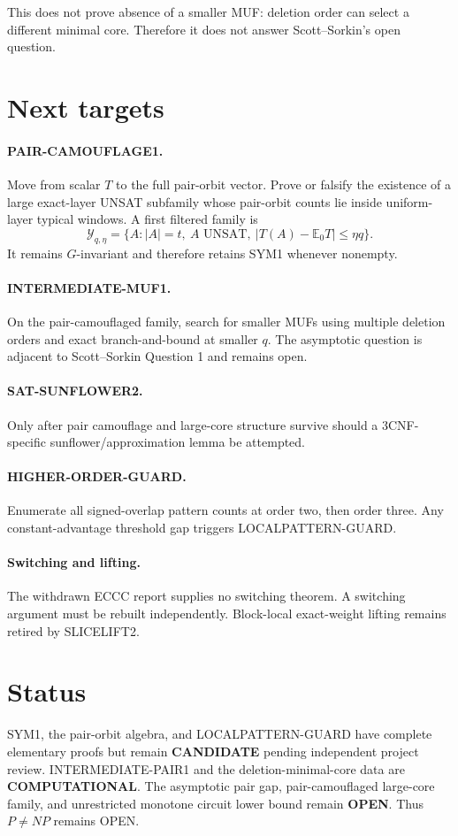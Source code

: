 \documentclass[11pt]{article}
\begin{document}
This does not prove absence of a smaller MUF: deletion order can select a
different minimal core. Therefore it does not answer Scott--Sorkin's open
question.

\section{Next targets}
\paragraph{PAIR-CAMOUFLAGE1.}
Move from scalar \(T\) to the full pair-orbit vector. Prove or falsify the
existence of a large exact-layer UNSAT subfamily whose pair-orbit counts lie
inside uniform-layer typical windows. A first filtered family is
\[
\mathcal Y_{q,\eta}
=
\{A:|A|=t,\ A\text{ UNSAT},
\ |T(A)-\mathbb E_0T|\le\eta q\}.
\]
It remains \(G\)-invariant and therefore retains SYM1 whenever nonempty.

\paragraph{INTERMEDIATE-MUF1.}
On the pair-camouflaged family, search for smaller MUFs using multiple
deletion orders and exact branch-and-bound at smaller \(q\). The asymptotic
question is adjacent to Scott--Sorkin Question 1 and remains open.

\paragraph{SAT-SUNFLOWER2.}
Only after pair camouflage and large-core structure survive should a
3CNF-specific sunflower/approximation lemma be attempted.

\paragraph{HIGHER-ORDER-GUARD.}
Enumerate all signed-overlap pattern counts at order two, then order three.
Any constant-advantage threshold gap triggers LOCALPATTERN-GUARD.

\paragraph{Switching and lifting.}
The withdrawn ECCC report supplies no switching theorem. A switching argument
must be rebuilt independently. Block-local exact-weight lifting remains
retired by SLICELIFT2.

\section{Status}
SYM1, the pair-orbit algebra, and LOCALPATTERN-GUARD have complete elementary
proofs but remain \textbf{CANDIDATE} pending independent project review.
INTERMEDIATE-PAIR1 and the deletion-minimal-core data are \textbf{COMPUTATIONAL}.
The asymptotic pair gap, pair-camouflaged large-core family, and unrestricted
monotone circuit lower bound remain \textbf{OPEN}. Thus \(P\ne NP\) remains OPEN.
\end{document}
